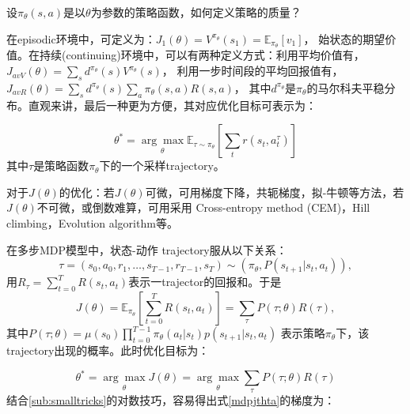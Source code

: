 \documentclass[UTF8]{ctexart}
\begin{document}
设$\pi_{\theta}(s, a)$是以$\theta$为参数的策略函数，如何定义策略的质量？

在episodic环境中，可定义为：$J_{1}(\theta)=V^{\pi_{\theta}}(s_1)=\mathbb{E}_{\pi_{\theta}}[v_1]$，
始状态的期望价值。在持续(continuing)环境中，可以有两种定义方式：利用平均价值有，$J_{avV}(\theta)=\sum_{s}d^{\pi_{\theta}}(s)V^{\pi_{\theta}}(s)$，
利用一步时间段的平均回报值有，$J_{avR}(\theta)=\sum_{s}d^{\pi_{\theta}}(s)\sum_{a}\pi_{\theta}(s,a)R(s,a)$，
其中$d^{\pi_{\theta}}$是$\pi_{\theta}$的马尔科夫平稳分布。直观来讲，最后一种更为方便，其对应优化目标可表示为：

\begin{equation}\theta^{*}=\underset{\theta}{\arg \max } \mathbb{E}_{\tau \sim \pi_{\theta}}
\left[\sum_{t} r\left(s_{t}, a_{t}^{\tau}\right)\right]\end{equation}
其中$\tau$是策略函数$\pi_{\theta}$下的一个采样trajectory。

对于$J(\theta)$的优化：若$J(\theta)$可微，可用梯度下降，共轭梯度，拟-牛顿等方法，若$J(\theta)$不可微，或倒数难算，可用采用
Cross-entropy method (CEM)，Hill climbing，Evolution algorithm等。


在多步MDP模型中，状态-动作 trajectory服从以下关系：
$$\tau = (s_0, a_0, r_1, 
\ldots, s_{T-1}, r_{T-1}, s_T) \sim (\pi_{\theta},
P(s_{t+1}|s_{t}, a_t)),$$
用$R_{\tau}=\sum_{t=0}^{T}R(s_t, a_t)$表示一trajector的回报和。于是
\begin{equation}\label{mdpjthta} J(\theta)=\mathbb{E}_{\pi_{\theta}}\left[\sum_{t=0}^{T} R\left(s_{t}, 
a_{t}\right)\right]=\sum_{\tau} P(\tau ; \theta) R(\tau),\end{equation}
其中$P(\tau ; \theta)=\mu\left(s_{0}\right) \prod_{t=0}^{T-1} \pi_{\theta}\left(a_{t} | s_{t}\right) p\left(s_{t+1} | s_{t}, a_{t}\right)$
表示策略$\pi_{\theta}$下，该trajectory出现的概率。此时优化目标为：

\begin{equation}\theta^{*}=\underset{\theta}{\arg \max } J(\theta)=
\underset{\theta}{\arg \max } \sum_{\tau} P(\tau ; \theta) R(\tau)\end{equation}
结合\ref{sub:smalltricks}的对数技巧，容易得出式\eqref{mdpjthta}的梯度为：
\end{document}
